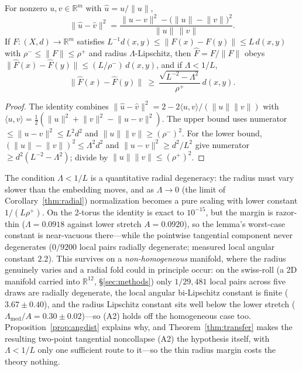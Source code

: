 \documentclass[review]{siamart220329}
\begin{document}
\begin{lemma}\label{lem:norm}
For nonzero $u,v\in\mathbb{R}^m$ with $\hat u=u/\lVert u\rVert$,
\[
\lVert\hat u-\hat v\rVert^2
=\frac{\lVert u-v\rVert^2-\big(\lVert u\rVert-\lVert v\rVert\big)^2}
      {\lVert u\rVert\,\lVert v\rVert}.
\]
If $F:(X,d)\to\mathbb{R}^m$ satisfies $L^{-1}d(x,y)\le\lVert F(x)-F(y)\rVert\le
L\,d(x,y)$ with $\rho^-\le\lVert F\rVert\le\rho^+$ and radius $\Lambda$-Lipschitz,
then $\hat F=F/\lVert F\rVert$ obeys $\lVert\hat F(x)-\hat F(y)\rVert\le
(L/\rho^-)\,d(x,y)$, and if $\Lambda<1/L$,
\[
\lVert\hat F(x)-\hat F(y)\rVert\ \ge\ \frac{\sqrt{L^{-2}-\Lambda^2}}{\rho^+}\,d(x,y).
\]
\end{lemma}

\begin{proof}
The identity combines $\lVert\hat u-\hat v\rVert^2=2-2\langle u,v\rangle/
(\lVert u\rVert\lVert v\rVert)$ with $\langle u,v\rangle=\tfrac12(\lVert u\rVert^2
+\lVert v\rVert^2-\lVert u-v\rVert^2)$. The upper bound uses numerator
$\le\lVert u-v\rVert^2\le L^2d^2$ and $\lVert u\rVert\lVert v\rVert\ge(\rho^-)^2$.
For the lower bound, $(\lVert u\rVert-\lVert v\rVert)^2\le\Lambda^2d^2$ and
$\lVert u-v\rVert^2\ge d^2/L^2$ give numerator $\ge d^2(L^{-2}-\Lambda^2)$;
divide by $\lVert u\rVert\lVert v\rVert\le(\rho^+)^2$.
\end{proof}

The condition $\Lambda<1/L$ is a quantitative radial degeneracy: the radius
must vary slower than the embedding moves, and as $\Lambda\to0$ (the limit of
Corollary~\ref{thm:radial}) normalization becomes a pure scaling with lower
constant $1/(L\rho^+)$. On the 2-torus the identity is exact to $10^{-15}$,
but the margin is razor-thin ($\Lambda=0.0918$ against lower stretch
$A=0.0920$), so the lemma's worst-case constant is near-vacuous there---while
the pointwise tangential component never degenerates ($0/9200$ local pairs
radially degenerate; measured local angular constant $2.2$). This survives on a
\emph{non-homogeneous} manifold, where the radius genuinely varies and a radial
fold could in principle occur: on the swiss-roll (a 2D manifold carried into
$\mathbb R^{12}$, \S\ref{sec:methods}) only $1/29{,}481$ local pairs across five
draws are radially degenerate, the local angular bi-Lipschitz constant is finite
($3.67\pm0.40$), and the radius Lipschitz constant sits well below the lower
stretch ($\Lambda_{\mathrm{med}}/A=0.30\pm0.02$)---so (A2) holds off the
homogeneous case too. Proposition~\ref{prop:angdist} explains why, and
Theorem~\ref{thm:transfer} makes the resulting two-point tangential
noncollapse (A2) the hypothesis itself, with $\Lambda<1/L$ only one
sufficient route to it---so the thin radius margin costs the theory nothing.
\end{document}
